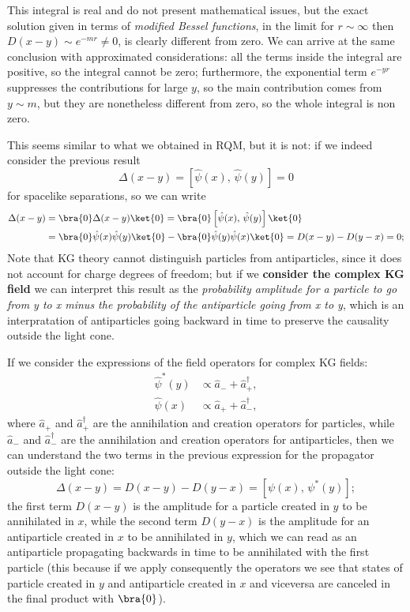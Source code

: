 This integral is real and do not present mathematical issues, but the exact solution given in terms of \textit{modified Bessel functions}, in the limit for \(r \sim \infty\) then \(D(x-y) \sim e^{-mr} \neq 0\), is clearly different from zero. We can arrive at the same conclusion with approximated considerations: all the terms inside the integral are positive, so the integral cannot be zero; furthermore, the exponential term \(e^{-yr}\) suppresses the contributions for large \(y\), so the main contribution comes from \(y \sim m\), but they are nonetheless different from zero, so the whole integral is non zero.

This seems similar to what we obtained in RQM, but it is not: if we indeed consider the previous result
\[
    \Delta(x-y) = \left[\hat \psi(x),\, \hat \psi(y)\right] = 0
\]
for spacelike separations, so we can write
\[
    \begin{aligned}
        \Delta(x-y) & = \bra{0}\Delta(x-y)\ket{0} = \bra{0} \left[\hat \psi(x),\, \hat \psi(y)\right] \ket{0}                      \\
                    & = \bra{0} \hat \psi(x) \hat \psi(y)\ket{0} - \bra{0} \hat \psi(y) \hat \psi(x)\ket{0} = D(x-y) - D(y-x) = 0;
    \end{aligned}
\]
Note that KG theory cannot distinguish particles from antiparticles, since it does not account for charge degrees of freedom; but if we \textbf{consider the complex KG field} we can interpret this result as the \textit{probability amplitude for a particle to go from y to x minus the probability of the antiparticle going from x to y}, which is an interpratation of antiparticles going backward in time to preserve the causality outside the light cone.

If we consider the expressions of the field operators for complex KG fields:
\[
    \begin{aligned}
        \hat{\psi}^{*} (y) & \propto \hat{a}_{-} + \hat{a}^{\dagger}_{+}, \\
        \hat{\psi} (x)     & \propto \hat{a}_{+} + \hat{a}^{\dagger}_{-},
    \end{aligned}
\]
where \(\hat{a}_{+}\) and \(\hat{a}^{\dagger}_{+}\) are the annihilation and creation operators for particles, while \(\hat{a}_{-}\) and \(\hat{a}^{\dagger}_{-}\) are the annihilation and creation operators for antiparticles, then we can understand the two terms in the previous expression for the propagator outside the light cone:
\[
    \Delta(x-y) = D(x-y) - D(y-x) = \left[ \psi(x),\,\psi^*(y) \right];
\]
the first term \(D(x-y)\) is the amplitude for a particle created in \(y\) to be annihilated in \(x\), while the second term \(D(y-x)\) is the amplitude for an antiparticle created in \(x\) to be annihilated in \(y\), which we can read as an antiparticle propagating backwards in time to be annihilated with the first particle (this because if we apply consequently the operators we see that states of particle created in \(y\) and antiparticle created in \(x\) and viceversa are canceled in the final product with \(\bra{0}\)).

